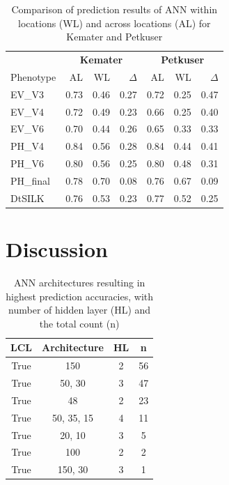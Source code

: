 \onehalfspacing
\begin{table}[H]
  \centering
  \caption[Comparison of prediction results of ANN within locations and across locations for Kemater and Petkuser]{Comparison of prediction results of ANN within locations (WL)  and across locations (AL) for Kemater and Petkuser}
  \begin{tabular}{lrrr|rrr}
    \toprule
    & \multicolumn{3}{c}{\textbf{Kemater}}  & \multicolumn{3}{c}{\textbf{Petkuser}} \\
    Phenotype & AL   & WL   & $\Delta$ & AL   & WL & $\Delta$ \\ 
    \midrule
    EV\_V3 & 0.73 & 0.46 & 0.27 & 0.72 & 0.25 & 0.47 \\ 
    EV\_V4 & 0.72 & 0.49 & 0.23 & 0.66 & 0.25 & 0.40 \\ 
    EV\_V6 & 0.70 & 0.44 & 0.26 & 0.65 & 0.33 & 0.33 \\ 
    PH\_V4 & 0.84 & 0.56 & 0.28 & 0.84 & 0.44 & 0.41 \\ 
    PH\_V6 & 0.80 & 0.56 & 0.25 & 0.80 & 0.48 & 0.31 \\ 
    PH\_final & 0.78 & 0.70 & 0.08 & 0.76 & 0.67 & 0.09 \\ 
    DtSILK & 0.76 & 0.53 & 0.23 & 0.77 & 0.52 & 0.25 \\ 
    \bottomrule
  \end{tabular}
\end{table}
\doublespacing

\section{Discussion}\label{gpdis}

\onehalfspacing
\begin{table}[H]
  \centering
  \caption[ANN architectures of ANN resulting in highest prediction accuracies]{ANN architectures resulting in highest prediction accuracies, with number of hidden layer (HL) and the total count (n)}
  \begin{tabular}{cccc}
  \toprule
    LCL & Architecture & HL & n \\ 
   \midrule
    True &  150        & 2 &  56  \\ 
    True &  50, 30     & 3 &  47  \\ 
    True &  48         & 2 &  23  \\ 
    True &  50, 35, 15 & 4 &  11  \\ 
    True &  20, 10     & 3 &   5  \\ 
    True &  100        & 2 &   2  \\ 
    True &  150, 30    & 3 &   1  \\ 
   \bottomrule
\end{tabular}
\end{table}
\doublespacing